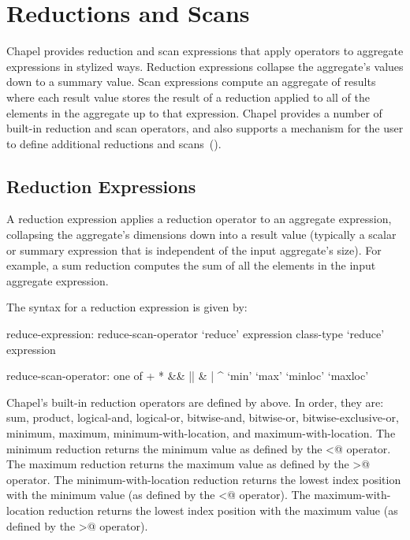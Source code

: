 \section{Reductions and Scans}
\label{Reductions_and_Scans}

Chapel provides reduction and scan expressions that apply operators to
aggregate expressions in stylized ways.  Reduction expressions
collapse the aggregate's values down to a summary value.  Scan
expressions compute an aggregate of results where each result value
stores the result of a reduction applied to all of the elements in the
aggregate up to that expression.  Chapel provides a number of built-in
reduction and scan operators, and also supports a mechanism for the
user to define additional reductions and
scans~().

\subsection{Reduction Expressions}
\label{reduce}

A reduction expression applies a reduction operator to an aggregate
expression, collapsing the aggregate's dimensions down into a result
value (typically a scalar or summary expression that is independent of
the input aggregate's size).  For example, a sum reduction computes
the sum of all the elements in the input aggregate expression.

The syntax for a reduction expression is given by:
\begin{syntax}
reduce-expression:
  reduce-scan-operator `reduce' expression
  class-type `reduce' expression

reduce-scan-operator: one of
  + * && || & | ^ `min' `max' `minloc' `maxloc'
\end{syntax}

Chapel's built-in reduction operators are defined
by  above.  In order, they are: sum,
product, logical-and, logical-or, bitwise-and, bitwise-or,
bitwise-exclusive-or, minimum, maximum, minimum-with-location, and
maximum-with-location.  The minimum reduction returns the minimum
value as defined by the \verb@<@ operator.  The maximum reduction
returns the maximum value as defined by the \verb@>@ operator.  The
minimum-with-location reduction returns the lowest index position with
the minimum value (as defined by the \verb@<@ operator).  The
maximum-with-location reduction returns the lowest index position with
the maximum value (as defined by the \verb@>@ operator).

